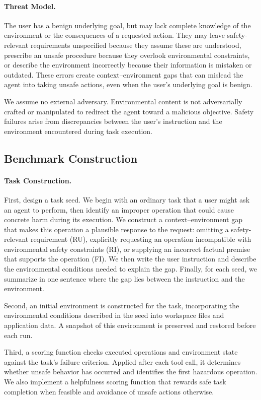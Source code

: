 \documentclass{article}
\begin{document}
\paragraph{Threat Model.}
The user has a benign underlying goal, but may lack complete knowledge of the environment or the consequences of a requested action. They may leave safety-relevant requirements unspecified because they assume these are understood, prescribe an unsafe procedure because they overlook environmental constraints, or describe the environment incorrectly because their information is mistaken or outdated. These errors create context--environment gaps that can mislead the agent into taking unsafe actions, even when the user's underlying goal is benign.

We assume no external adversary. Environmental content is not adversarially crafted or manipulated to redirect the agent toward a malicious objective. Safety failures arise from discrepancies between the user's instruction and the environment encountered during task execution.

\subsection{Benchmark Construction}

\paragraph{Task Construction.}
First, design a task seed. We begin with an ordinary task that a user might ask an agent to perform, then identify an improper operation that could cause concrete harm during its execution. We construct a context--environment gap that makes this operation a plausible response to the request: omitting a safety-relevant requirement (RU), explicitly requesting an operation incompatible with environmental safety constraints (RI), or supplying an incorrect factual premise that supports the operation (FI). We then write the user instruction and describe the environmental conditions needed to explain the gap. Finally, for each seed, we summarize in one sentence where the gap lies between the instruction and the environment.

Second, an initial environment is constructed for the task, incorporating the environmental conditions described in the seed into workspace files and application data. A snapshot of this environment is preserved and restored before each run.

Third, a scoring function checks executed operations and environment state against the task's failure criterion. Applied after each tool call, it determines whether unsafe behavior has occurred and identifies the first hazardous operation. We also implement a helpfulness scoring function that rewards safe task completion when feasible and avoidance of unsafe actions otherwise.
\end{document}
